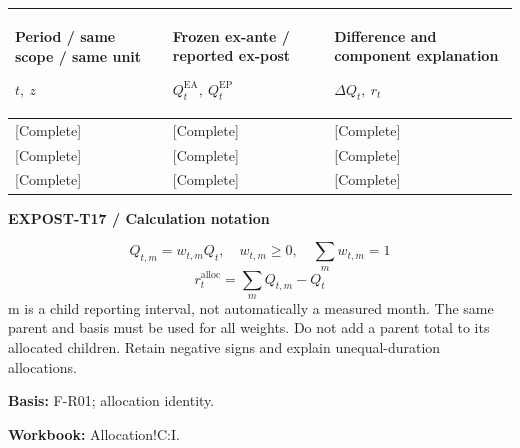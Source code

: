 {\sffamily\fontsize{8.3}{10.3}\selectfont\begin{longtable}{@{}P{54.83mm} P{54.83mm} P{54.83mm}@{}}
\toprule
\textbf{Period / same scope / same unit}\par {\normalfont\fontsize{8.2}{10}\selectfont $t,\ z$} & \textbf{Frozen ex-ante / reported ex-post}\par {\normalfont\fontsize{8.2}{10}\selectfont $Q_t^{\mathrm{EA}},\ Q_t^{\mathrm{EP}}$} & \textbf{Difference and component explanation}\par {\normalfont\fontsize{8.2}{10}\selectfont $\Delta Q_t,\ r_t$}\\\midrule\endhead
\rule{0pt}{8mm}[Complete] & [Complete] & [Complete]\\\hline
\rule{0pt}{8mm}[Complete] & [Complete] & [Complete]\\\hline
\rule{0pt}{8mm}[Complete] & [Complete] & [Complete]\\\hline
\end{longtable}}
\par\begingroup\sffamily\fontsize{8}{10}\selectfont\color{NEBGreen}\setlength{\parskip}{2pt}\setlength{\abovedisplayskip}{4pt}\setlength{\belowdisplayskip}{4pt}\setlength{\abovedisplayshortskip}{2pt}\setlength{\belowdisplayshortskip}{3pt}
\textbf{EXPOST-T17 / Calculation notation}\par
{\fontsize{9}{11}\selectfont\[ Q_{t,m}=w_{t,m}Q_t,\quad w_{t,m}\ge0,\quad \sum_m w_{t,m}=1 \]}
{\fontsize{9}{11}\selectfont\[ r_t^{\mathrm{alloc}}=\sum_m Q_{t,m}-Q_t \]}
m is a child reporting interval, not automatically a measured month. The same parent and basis must be used for all weights. Do not add a parent total to its allocated children. Retain negative signs and explain unequal-duration allocations.\par
\textbf{Basis:} F-R01; allocation identity.\par
\textbf{Workbook:} Allocation!C:I.\par\endgroup
